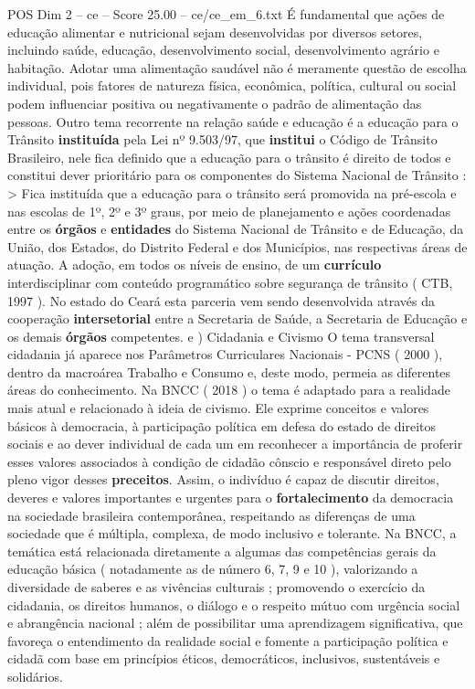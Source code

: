 \begin{textsample}{POS Dim 2 – ce – Score 25.00 – ce/ce\_em\_6.txt}
É fundamental que ações de educação alimentar e nutricional sejam desenvolvidas por diversos setores, incluindo saúde, educação, desenvolvimento social, desenvolvimento agrário e habitação.
Adotar uma alimentação saudável não é meramente questão de escolha individual, pois fatores de natureza física, econômica, política, cultural ou social podem influenciar positiva ou negativamente o padrão de alimentação das pessoas.
Outro tema recorrente na relação saúde e educação é a educação para o Trânsito \textbf{instituída} pela Lei nº 9.503/97, que \textbf{institui} o Código de Trânsito Brasileiro, nele fica definido que a educação para o trânsito é direito de todos e constitui dever prioritário para os componentes do Sistema Nacional de Trânsito : > Fica instituída que a educação para o trânsito será promovida na pré-escola e nas escolas de 1º, 2º e 3º graus, por meio de planejamento e ações coordenadas entre os \textbf{órgãos} e \textbf{entidades} do Sistema Nacional de Trânsito e de Educação, da União, dos Estados, do Distrito Federal e dos Municípios, nas respectivas áreas de atuação.
A adoção, em todos os níveis de ensino, de um \textbf{currículo} interdisciplinar com conteúdo programático sobre segurança de trânsito ( CTB, 1997 ).
No estado do Ceará esta parceria vem sendo desenvolvida através da cooperação \textbf{intersetorial} entre a Secretaria de Saúde, a Secretaria de Educação e os demais \textbf{órgãos} competentes. e ) Cidadania e Civismo O tema transversal cidadania já aparece nos Parâmetros Curriculares Nacionais - PCNS ( 2000 ), dentro da macroárea Trabalho e Consumo e, deste modo, permeia as diferentes áreas do conhecimento.
Na BNCC ( 2018 ) o tema é adaptado para a realidade mais atual e relacionado à ideia de civismo.
Ele exprime conceitos e valores básicos à democracia, à participação política em defesa do estado de direitos sociais e ao dever individual de cada um em reconhecer a importância de proferir esses valores associados à condição de cidadão cônscio e responsável direto pelo pleno vigor desses \textbf{preceitos}.
Assim, o indivíduo é capaz de discutir direitos, deveres e valores importantes e urgentes para o \textbf{fortalecimento} da democracia na sociedade brasileira contemporânea, respeitando as diferenças de uma sociedade que é múltipla, complexa, de modo inclusivo e tolerante.
Na BNCC, a temática está relacionada diretamente a algumas das competências gerais da educação básica ( notadamente as de número 6, 7, 9 e 10 ), valorizando a diversidade de saberes e as vivências culturais ; promovendo o exercício da cidadania, os direitos humanos, o diálogo e o respeito mútuo com urgência social e abrangência nacional ; além de possibilitar uma aprendizagem significativa, que favoreça o entendimento da realidade social e fomente a participação política e cidadã com base em princípios éticos, democráticos, inclusivos, sustentáveis e solidários.

\end{textsample}
